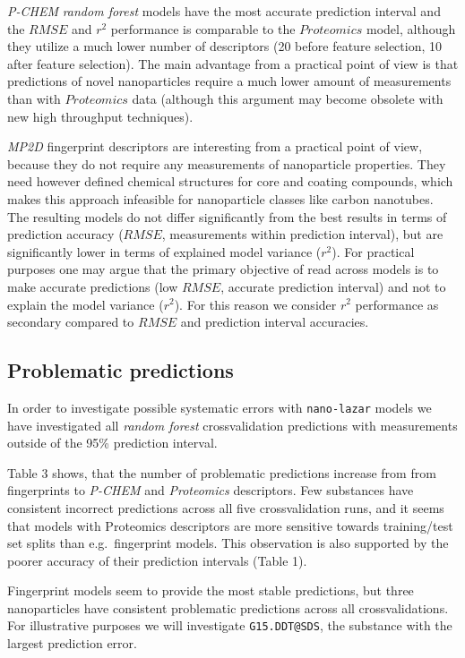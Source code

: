 \documentclass[utf8]{frontiersHLTH} %
\begin{document}
\emph{P-CHEM} \emph{random forest} models have the most accurate
prediction interval and the \(RMSE\) and \(r^2\) performance is
comparable to the \(Proteomics\) model, although they utilize a much
lower number of descriptors (20 before feature selection, 10 after
feature selection). The main advantage from a practical point of view is
that predictions of novel nanoparticles require a much lower amount of
measurements than with \(Proteomics\) data (although this argument may
become obsolete with new high throughput techniques).

\emph{MP2D} fingerprint descriptors are interesting from a practical
point of view, because they do not require any measurements of
nanoparticle properties. They need however defined chemical structures
for core and coating compounds, which makes this approach infeasible for
nanoparticle classes like carbon nanotubes. The resulting models do not
differ significantly from the best results in terms of prediction
accuracy (\(RMSE\), measurements within prediction interval), but are
significantly lower in terms of explained model variance (\(r^2\)). For
practical purposes one may argue that the primary objective of read
across models is to make accurate predictions (low \(RMSE\), accurate
prediction interval) and not to explain the model variance (\(r^2\)).
For this reason we consider \(r^2\) performance as secondary compared to
\(RMSE\) and prediction interval accuracies.

\subsection{Problematic predictions}\label{problematic-predictions}

In order to investigate possible systematic errors with
\texttt{nano-lazar} models we have investigated all \emph{random forest}
crossvalidation predictions with measurements outside of the 95\%
prediction interval.

Table 3 shows, that the number of problematic predictions increase from
from fingerprints to \emph{P-CHEM} and \emph{Proteomics} descriptors.
Few substances have consistent incorrect predictions across all five
crossvalidation runs, and it seems that models with Proteomics
descriptors are more sensitive towards training/test set splits than
e.g.~fingerprint models. This observation is also supported by the
poorer accuracy of their prediction intervals (Table 1).

Fingerprint models seem to provide the most stable predictions, but
three nanoparticles have consistent problematic predictions across all
crossvalidations. For illustrative purposes we will investigate
\texttt{G15.DDT@SDS}, the substance with the largest prediction error.
\end{document}
